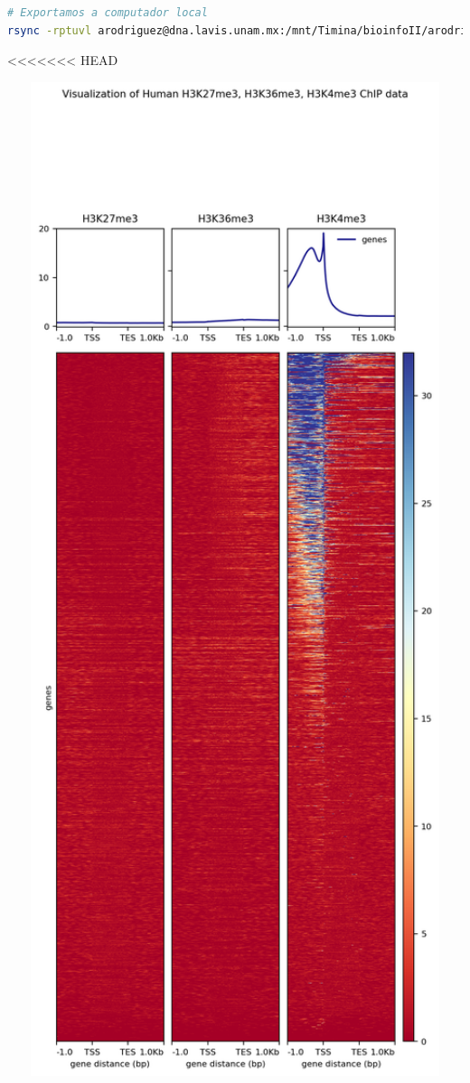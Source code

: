\documentclass[
]{article}
\begin{document}
\begin{lstlisting}[language=bash]
# Exportamos a computador local
rsync -rptuvl arodriguez@dna.lavis.unam.mx:/mnt/Timina/bioinfoII/arodriguez/Visualization/HistonesHeatmap.png .
\end{lstlisting}

<<<<<<< HEAD
\begin{center}\includegraphics[width=600px]{./T04_images/HistonesHeatmap} \end{center}
\end{document}
